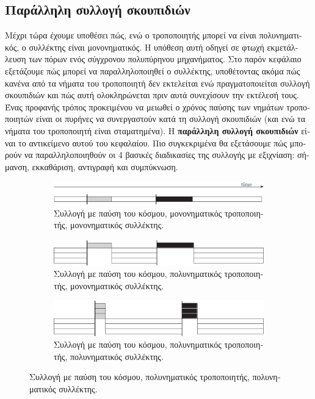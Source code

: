 \begin{greek}

\chapter{Παράλληλη συλλογή σκουπιδιών}\label{ch:par}
Μέχρι τώρα έχουμε υποθέσει πώς, ενώ ο τροποποιητής μπορεί να
είναι πολυνηματικός, ο συλλέκτης είναι μονονηματικός. Η υπόθεση
αυτή οδηγεί σε φτωχή εκμετάλλευση των πόρων ενός σύγχρονου
πολυπύρηνου μηχανήματος. Στο παρόν κεφάλαιο εξετάζουμε πώς
μπορεί να παραλληλοποιηθεί ο συλλέκτης, υποθέτοντας ακόμα πώς
κανένα από τα νήματα του τροποποιητή δεν εκτελείται ενώ
πραγματοποιείται συλλογή σκουπιδιών και πώς αυτή ολοκληρώνεται
πριν αυτά συνεχίσουν την εκτέλεσή τους. Ένας προφανής τρόπος
προκειμένου να μειωθεί ο χρόνος παύσης των νημάτων τροποποιητών
είναι οι πυρήνες να συνεργαστούν κατά τη συλλογή σκουπιδιών
(και ενώ τα νήματα του τροποποιητή είναι σταματημένα). Η 
\textbf{παράλληλη συλλογή σκουπιδιών} είναι το αντικείμενο
αυτού του κεφαλαίου. Πιο συγκεκριμένα θα εξετάσουμε πώς μπορούν
να παραλληλοποιηθούν οι 4 βασικές διαδικασίες της συλλογής
με εξιχνίαση: σήμανση, εκκαθάριση, αντιγραφή και συμπύκνωση.

\begin{figure}
  \centering
  \begin{subfigure}{1.0\textwidth}
    \includegraphics{figures/par_1a}
    \caption
      {Συλλογή με παύση του κόσμου, μονονηματικός τροποποιητής, 
       μονονηματικός συλλέκτης.}
  \end{subfigure}

  \begin{subfigure}[b]{1.0\textwidth}
    \includegraphics{figures/par_1b}
    \caption
      {Συλλογή με παύση του κόσμου, πολυνηματικός τροποποιητής,
       μονονηματικός συλλέκτης.}
  \end{subfigure}
  
  \begin{subfigure}[b]{1.0\textwidth}
    \includegraphics{figures/par_1c}
    \caption
      {Συλλογή με παύση του κόσμου, πολυνηματικός τροποποιητής,
       πολυνηματικός συλλέκτης.}
  \end{subfigure}
  

\end{figure}
\end{greek}
